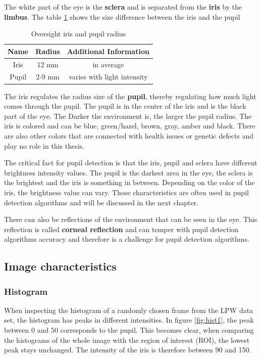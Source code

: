    The white part of the eye is the \textbf{sclera} and is separated from the \textbf{iris} by the \textbf{limbus}. The table \ref{tab:eye_char} shows the size difference between the iris and the pupil \cite{drahansky_recognition_2018}
    \begin{table}[h]
      \centering 
      \begin{minipage}{0.7\textwidth}
        \centering
        \begin{tabular}{|c|c|c|}
          \hline
          Name & Radius & Additional Information \\
          \hline
          Iris & 12 mm & in average\\
          Pupil & 2-9 mm & varies with light intensity\\
          \hline
        \end{tabular}
        \caption{Oversight iris and pupil radius}
        \label{tab:eye_char}
      \end{minipage}\hfill
    \end{table}
 

    The iris regulates the radius size of the \textbf{pupil}, thereby regulating how much light comes through the pupil. The pupil is in the center of the iris and is the black part of the eye. The Darker the environment is, the larger the pupil radius. The iris is colored and can be blue, green/hazel, brown, gray, amber and black. There are also other colors that are connected with health issues or genetic defects and play no role in this thesis. 

    The critical fact for pupil detection is that the iris, pupil and sclera have different brightness intensity values. The pupil is the darkest area in the eye, the sclera is the brightest and the iris is something in between. Depending on the color of the iris, the brightness value can vary. Those characteristics are often used in pupil detection algorithms and will be discussed in the next chapter.

    There can also be reflections of the environment that can be seen in the eye. This reflection is called \textbf{corneal reflection} and can temper with pupil detection algorithms accuracy and therefore is a challenge for pupil detection algorithms.


    \subsection{Image characteristics}
    \subsubsection{Histogram}
    When inspecting the histogram of a randomly chosen frame from the LPW data set, the histogram has peaks in different intensities. In figure \ref{fig:hist1}, the peak between 0 and 50 corresponds to the pupil. This becomes clear, when comparing the histograms of the whole image with the region of interest (ROI), the lowest peak stays unchanged. The intensity of the iris is therefore between 90 and 150.

